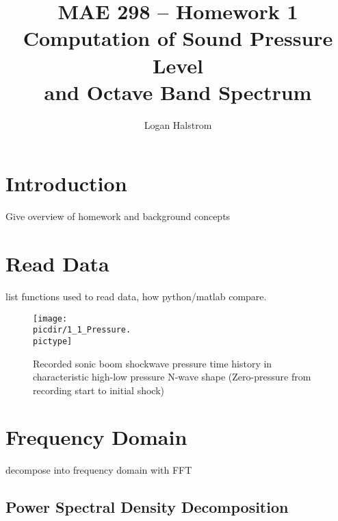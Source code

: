 \documentclass[twocolumn,10pt]{asme2ej}
\title{MAE 298 -- Homework 1\\Computation of Sound Pressure Level\\and Octave Band Spectrum}
\author{Logan Halstrom
    \affiliation{
	PhD Graduate Student Researcher\\
	Center for Human/Robot/Vehicle Integration and Performance\\
	Department of Mechanical and Aerospace Engineering\\
	University of California, Davis\\
    Email: ldhalstrom@ucdavis.edu
    }
}
\begin{document}
\maketitle


\newcommand\pictype{png}  %
\newcommand\picdir{../Plots} %



\section{Introduction}

Give overview of homework and background concepts


\section{Read Data}

list functions used to read data, how python/matlab compare.

\begin{figure}[htb]
\begin{center}
\texttt{[image: \\picdir/1\_1\_Pressure.\\pictype]}
\caption{Recorded sonic boom shockwave pressure time history in characteristic high-low pressure N-wave shape (Zero-pressure from recording start to initial shock)}
\label{pic_Nwave}
\end{center}
\end{figure}



\section{Frequency Domain}

decompose into frequency domain with FFT


\subsection{Power Spectral Density Decomposition}
\end{document}
